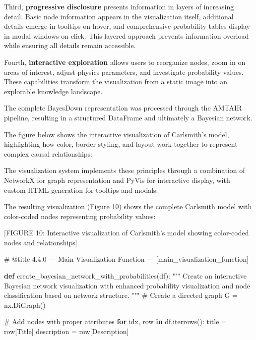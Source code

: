 \documentclass[
  11pt,
  letterpaper,
]{book}
\newenvironment{Shaded}{\begin{snugshade}}{\end{snugshade}}
\newcommand{\CommentTok}[1]{\textcolor[rgb]{0.37,0.37,0.37}{#1}}
\newcommand{\ControlFlowTok}[1]{\textcolor[rgb]{0.00,0.23,0.31}{\textbf{#1}}}
\newcommand{\KeywordTok}[1]{\textcolor[rgb]{0.00,0.23,0.31}{\textbf{#1}}}
\newcommand{\NormalTok}[1]{\textcolor[rgb]{0.00,0.23,0.31}{#1}}
\newcommand{\OperatorTok}[1]{\textcolor[rgb]{0.37,0.37,0.37}{#1}}
\newcommand{\StringTok}[1]{\textcolor[rgb]{0.13,0.47,0.30}{#1}}
\begin{document}
\begin{landscape}
Third, \textbf{progressive disclosure} presents information in layers of
increasing detail. Basic node information appears in the visualization
itself, additional details emerge in tooltips on hover, and
comprehensive probability tables display in modal windows on click. This
layered approach prevents information overload while ensuring all
details remain accessible.

Fourth, \textbf{interactive exploration} allows users to reorganize
nodes, zoom in on areas of interest, adjust physics parameters, and
investigate probability values. These capabilities transform the
visualization from a static image into an explorable knowledge
landscape.

The complete BayesDown representation was processed through the AMTAIR
pipeline, resulting in a structured DataFrame and ultimately a Bayesian
network.

The figure below shows the interactive visualization of Carlsmith's
model, highlighting how color, border styling, and layout work together
to represent complex causal relationships:

The visualization system implements these principles through a
combination of NetworkX for graph representation and PyVis for
interactive display, with custom HTML generation for tooltips and
modals:

The resulting visualization (Figure 10) shows the complete Carlsmith
model with color-coded nodes representing probability values:

{[}FIGURE 10: Interactive visualization of Carlsmith's model showing
color-coded nodes and relationships{]}

\label{main_visualization_function}
\begin{Shaded}
\begin{Highlighting}[]
\CommentTok{\# @title 4.4.0 {-}{-}{-} Main Visualization Function {-}{-}{-} [main\_visualization\_function]}

\KeywordTok{def}\NormalTok{ create\_bayesian\_network\_with\_probabilities(df):}
    \CommentTok{"""}
\CommentTok{    Create an interactive Bayesian network visualization with enhanced}
\CommentTok{    probability visualization and node classification based on network structure.}
\CommentTok{    """}
    \CommentTok{\# Create a directed graph}
\NormalTok{    G }\OperatorTok{=}\NormalTok{ nx.DiGraph()}

    \CommentTok{\# Add nodes with proper attributes}
    \ControlFlowTok{for}\NormalTok{ idx, row }\KeywordTok{in}\NormalTok{ df.iterrows():}
\NormalTok{        title }\OperatorTok{=}\NormalTok{ row[}\StringTok{\textquotesingle{}Title\textquotesingle{}}\NormalTok{]}
\NormalTok{        description }\OperatorTok{=}\NormalTok{ row[}\StringTok{\textquotesingle{}Description\textquotesingle{}}\NormalTok{]}


\end{Highlighting}
\end{Shaded}
\end{landscape}
\end{document}

